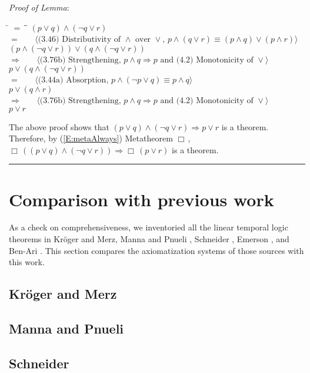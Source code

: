\documentclass[12pt, fleqn, leqno]{article}
\newcommand{\lgap}{2pt}                             %
\newcommand{\mymathindent}{24pt}                    %
\newcommand{\impl}{\ensuremath{\Rightarrow}}        %
\newcommand{\Always}{\Box\,}
\newcommand{\myqed}{\rule[-.23ex]{1.2ex}{2.0ex}}
\newcommand{\myqedtab}{\hspace{384pt}}              %
\newcommand{\Gll} {\langle}                         %
\newcommand{\Ggg} {\rangle}                         %
\newcommand{\Hint}[1]     {\ \ \ $\Gll              \mbox{#1} \Ggg$ }   %
\begin{document}
\emph{Proof of Lemma}:
\begin{tabbing}
\hspace{\mymathindent} \= $= \;$ \= \myqedtab \= \kill
  \> \>   $(p\lor q)\land (\neg q\lor r)$\\[\lgap]
  \> $=$  \>  \Hint{(3.46) Distributivity of $\land$ over $\lor$, $p\land(q\lor r) \equiv (p\land q)\lor (p\land r)$}\\[\lgap]
  \> \>   $(p\land (\neg q\lor r))\lor (q\land (\neg q\lor r))$\\[\lgap]
  \> $\impl$  \>  \Hint{(3.76b) Strengthening, $p\land q \impl p$ and (4.2) Monotonicity of $\lor$}\\[\lgap]
  \> \>   $p\lor (q\land (\neg q\lor r))$\\[\lgap]
  \> $=$  \>  \Hint{(3.44a) Absorption, $p\land (\neg p\lor q)\equiv p\land q$}\\[\lgap]
  \> \>   $p\lor (q\land r)$\\[\lgap]
  \> $\impl$  \>  \Hint{(3.76b) Strengthening, $p\land q \impl p$ and (4.2) Monotonicity of $\lor$}\\[\lgap]
  \> \>   $p\lor r$
\end{tabbing}
The above proof shows that $(p\lor q)\land (\neg q\lor r) \impl p\lor r$ is a theorem.
Therefore, by (\ref{E:metaAlways}) Metatheorem $\Always$, $\Always ((p\lor q)\land (\neg q\lor r)) \impl \Always (p\lor r)$ is a theorem. \quad \myqed

\section{Comparison with previous work}\label{comparison-previous-work}

As a check on comprehensiveness, we inventoried all the linear temporal logic theorems in Kröger and Merz\cite{Kroger}, Manna and Pnueli \cite{Manna}, Schneider \cite{Schn}, Emerson \cite{Emer}, and Ben-Ari \cite{Ben}.
This section compares the axiomatization systems of those sources with this work.

\subsection{Kröger and Merz}

\subsection{Manna and Pnueli}

\subsection{Schneider}
\end{document}

